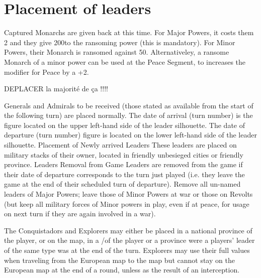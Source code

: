 


\section{Placement of leaders}\label{chInter:Leaders}

Captured Monarchs are given back at this time.
\bparag For Major Powers, it costs them 2 \STAB and they give 200\ducats to
the ransoming power (this is mandatory).
\bparag For Minor Powers, their Monarch is ransomed against 50\ducats.
\bparag Alternativeley, a ransome Monarch of a minor power can be used at the
Peace Segment, to increases the modifier for Peace by a +2.

\begin{todo}
  DEPLACER la majorité de ça !!!!
\end{todo}
\aparag Generals and Admirals to be received (those stated as available from
the start of the following turn) are placed normally.
The date of arrival (turn number) is the figure located on the upper left-hand
side of the leader silhouette.  The date of departure (turn number) figure is
located on the lower left-hand side of the leader silhouette.
\bparag Placement of Newly arrived Leaders These leaders are placed on
military stacks of their owner, located in friendly unbesieged cities or
friendly province.
\bparag Leaders Removal from Game Leaders are removed from the game if their
date of departure corresponds to the turn just played (i.e. they leave the
game at the end of their scheduled turn of departure).
\bparag Remove all un-named leaders of Major Powers; leave those of Minor
Powers at war or those on Revolts (but keep all military forces of Minor
powers in play, even if at peace, for usage on next turn if they are again
involved in a war).

The Conquistadors and Explorers may either be placed in a national province of
the player, or on the \ROTW map, in a \COL/\TP of the player or a province
were a players' leader of the same type was at the end of the turn.
\bparag Explorers may use their full values when traveling from the European
map to the \ROTW map but cannot stay on the European map at the end of a
round, unless as the result of an interception.


